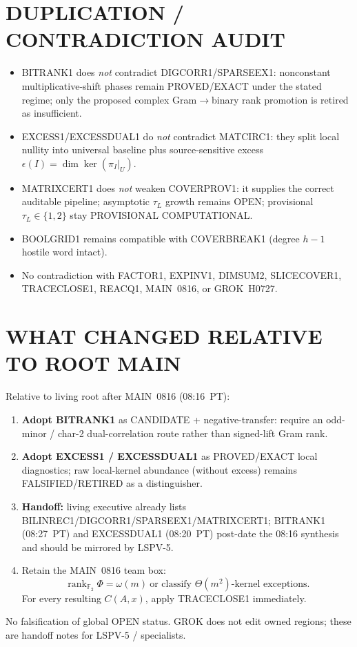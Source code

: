 \documentclass[11pt]{article}
\begin{document}
\section*{DUPLICATION / CONTRADICTION AUDIT}
\begin{itemize}
\item BITRANK1 does \emph{not} contradict DIGCORR1/SPARSEEX1: nonconstant multiplicative-shift
phases remain PROVED/EXACT under the stated regime; only the proposed complex Gram$\to$binary
rank promotion is retired as insufficient.
\item EXCESS1/EXCESSDUAL1 do \emph{not} contradict MATCIRC1: they split local nullity into
universal baseline plus source-sensitive excess $\epsilon(I)=\dim\ker(\pi_I|_U)$.
\item MATRIXCERT1 does \emph{not} weaken COVERPROV1: it supplies the correct auditable
pipeline; asymptotic $\tau_L$ growth remains OPEN; provisional $\tau_L\in\{1,2\}$ stay
PROVISIONAL COMPUTATIONAL.
\item BOOLGRID1 remains compatible with COVERBREAK1 (degree $h-1$ hostile word intact).
\item No contradiction with FACTOR1, EXPINV1, DIMSUM2, SLICECOVER1, TRACECLOSE1, REACQ1,
MAIN~0816, or GROK~H0727.
\end{itemize}

\section*{WHAT CHANGED RELATIVE TO ROOT MAIN}
Relative to living root after MAIN~0816 (08:16~PT):
\begin{enumerate}
\item \textbf{Adopt BITRANK1} as CANDIDATE + negative-transfer: require an odd-minor /
char-2 dual-correlation route rather than signed-lift Gram rank.
\item \textbf{Adopt EXCESS1 / EXCESSDUAL1} as PROVED/EXACT local diagnostics;
raw local-kernel abundance (without excess) remains FALSIFIED/RETIRED as a distinguisher.
\item \textbf{Handoff:} living executive already lists BILINREC1/DIGCORR1/SPARSEEX1/MATRIXCERT1;
BITRANK1 (08:27~PT) and EXCESSDUAL1 (08:20~PT) post-date the 08:16 synthesis and should
be mirrored by LSPV-5.
\item Retain the MAIN~0816 team box:
\[
\boxed{\operatorname{rank}_{\mathbb F_2}\Phi=\omega(m)\ \text{or classify }\Theta(m^2)\text{-kernel exceptions}.}
\]
For every resulting $C(A,x)$, apply TRACECLOSE1 immediately.
\end{enumerate}
No falsification of global OPEN status. GROK does not edit owned regions; these are
handoff notes for LSPV-5 / specialists.
\end{document}
